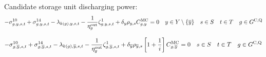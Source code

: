 \documentclass{article}
\begin{document}

Candidate storage unit discharging power:
\begin{equation}
- \dNonNegativeDischarging + \dMaxDischargingRateCandidate - \dPowerBalance[k(\iGenerator),\iYear,\iScenario,\iInterval] - \frac{1}{\cStorageUnitEfficiencyDischarging} \dStorageEnergyTransition + \cDiscountRate \cScenarioDuration \cMarginalCost = 0 \quad \iYear \in \sYears \setminus \{\iYearTerminal\} \quad \iScenario \in \sScenarios \quad \iInterval \in \sIntervals \quad \iGenerator \in \sStorageCandidate
\end{equation}

\begin{equation}
- \dNonNegativeDischarging[\iGenerator,\iYearTerminal,\iScenario,\iInterval] + \dMaxDischargingRateCandidate[\iGenerator,\iYearTerminal,\iScenario,\iInterval] - \dPowerBalance[k(\iGenerator),\iYearTerminal,\iScenario,\iInterval] - \frac{1}{\cStorageUnitEfficiencyDischarging} \dStorageEnergyTransition[\iGenerator,\iYearTerminal,\iScenario,\iInterval] + \cDiscountRate[\iYearTerminal] \cScenarioDuration[\iYearTerminal,\iScenario] \left[1 + \frac{1}{\cInterestRate}\right] \cMarginalCost[\iGenerator,\iYearTerminal] = 0 \quad \iScenario \in \sScenarios \quad \iInterval \in \sIntervals \quad \iGenerator \in \sStorageCandidate
\end{equation}
\end{document}
